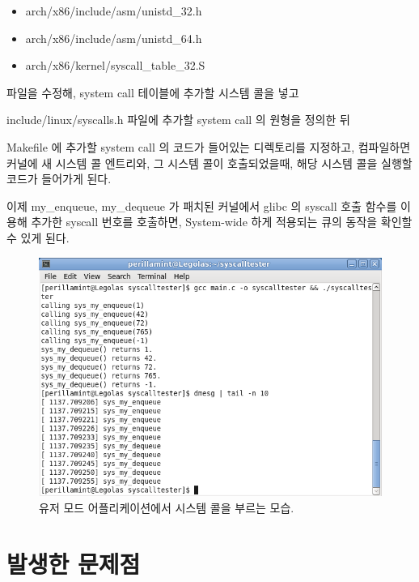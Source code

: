 \documentclass {article}
\begin{document}
\vspace{\baselineskip}
\begin {itemize}
  \item arch/x86/include/asm/unistd\_32.h
  \item arch/x86/include/asm/unistd\_64.h
  \item arch/x86/kernel/syscall\_table\_32.S
\end {itemize}

\vspace{\baselineskip}
파일을 수정해, system call 테이블에 추가할 시스템 콜을 넣고

include/linux/syscalls.h
파일에 추가할 system call 의 원형을 정의한 뒤

Makefile 에 추가할 system call 의 코드가 들어있는 디렉토리를 지정하고,
컴파일하면 커널에 새 시스템 콜 엔트리와, 그 시스템 콜이 호출되었을때,
해당 시스템 콜을 실행할 코드가 들어가게 된다.

이제 my\_enqueue, my\_dequeue 가 패치된 커널에서 glibc 의 syscall 호출 함수를 이용해\linebreak
추가한 syscall 번호를 호출하면, System-wide 하게 적용되는
큐의 동작을 확인할 수 있게 된다.

\begin {figure}[h]
  \centering
  \includegraphics [width=120mm]{syscalluserapp.png}
  \caption {유저 모드 어플리케이션에서 시스템 콜을 부르는 모습.}
  \label{fig:syscalluserapp}
\end {figure}


\section {발생한 문제점}
\end{document}
